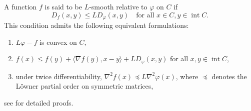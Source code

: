 \documentclass[11pt,reqno]{amsart}
\numberwithin{equation}{section}
\numberwithin{figure}{section}
\theoremstyle{plain}
\theoremstyle{definition}
\newcommand{\la}{\langle}
\newcommand{\ra}{\rangle}
\newcommand{\vphi}{\varphi}
\newcommand{\df}{\nabla f}
\DeclareMathOperator{\intr}{int}
\begin{document}
A function $f$ is said to be $L$-smooth relative to $\vphi$ on $C$ if
\begin{equation}
    D_f(x,y) \leq L D_\vphi(x,y) \quad \text{for all } x \in C, y \in \intr C.
\end{equation}
This condition admits the following equivalent formulations:
\begin{enumerate}
    \item $L\vphi-f$ is convex on $C$,
    \item $f(x) \leq f(y) + \la \df(y), x-y \ra + LD_\vphi(x,y)$ for all $x, y \in \intr C$,
    \item under twice differentiability, $\nabla^2 f(x) \preceq L \nabla^2 \vphi(x)$, where $\preceq$ denotes the L\"owner partial order 
    on symmetric matrices,
\end{enumerate}
see \cite{Bauschke:2017aa,Lu2018} for detailed proofs.
\end{document}
